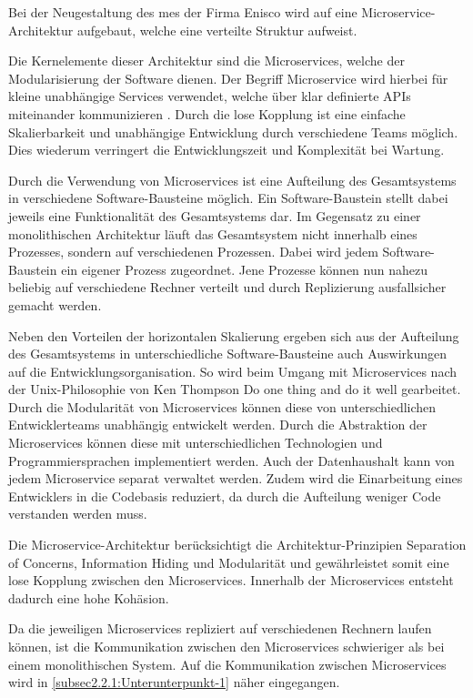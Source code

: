 Bei der Neugestaltung des \gls{mes} der Firma Enisco wird auf eine Microservice-Architektur aufgebaut, welche eine verteilte Struktur aufweist.

Die Kernelemente dieser Architektur sind die Microservices, welche der Modularisierung der Software dienen. Der Begriff Microservice wird hierbei für kleine unabhängige Services verwendet, welche über klar definierte APIs miteinander kommunizieren \cite{AmazonWebServicesInc..2021}. Durch die lose Kopplung ist eine einfache Skalierbarkeit und unabhängige Entwicklung durch verschiedene Teams möglich. Dies wiederum verringert die Entwicklungszeit und Komplexität bei Wartung.

Durch die Verwendung von Microservices ist eine Aufteilung des Gesamtsystems in verschiedene Software-Bausteine möglich. Ein Software-Baustein stellt dabei jeweils eine Funktionalität des Gesamtsystems dar. Im Gegensatz zu einer monolithischen Architektur läuft das Gesamtsystem nicht innerhalb eines Prozesses, sondern auf verschiedenen Prozessen. Dabei wird jedem Software-Baustein ein eigener Prozess zugeordnet. Jene Prozesse können nun nahezu beliebig auf verschiedene Rechner verteilt und durch Replizierung ausfallsicher gemacht werden. \cite{GaryCalcott.2018}

Neben den Vorteilen der horizontalen Skalierung ergeben sich aus der Aufteilung des Gesamtsystems in unterschiedliche Software-Bausteine auch Auswirkungen auf die Entwicklungsorganisation. So wird beim Umgang mit Microservices nach der Unix-Philosophie von Ken Thompson \glqq Do one thing and do it well\grqq{} \cite{IONOSSE.2021} gearbeitet. Durch die Modularität von Microservices können diese von unterschiedlichen Entwicklerteams unabhängig entwickelt werden. Durch die Abstraktion der Microservices können diese mit unterschiedlichen Technologien und Programmiersprachen implementiert werden. Auch der Datenhaushalt kann von jedem Microservice separat verwaltet werden. Zudem wird die Einarbeitung eines Entwicklers in die Codebasis reduziert, da durch die Aufteilung weniger Code verstanden werden muss.

Die Microservice-Architektur berücksichtigt die Architektur-Prinzipien Separation of Concerns, Information Hiding und Modularität und gewährleistet somit eine lose Kopplung zwischen den Microservices. Innerhalb der Microservices entsteht dadurch eine hohe Kohäsion.

Da die jeweiligen Microservices repliziert auf verschiedenen Rechnern laufen können, ist die Kommunikation zwischen den Microservices schwieriger als bei einem monolithischen System. Auf die Kommunikation zwischen Microservices wird in \autoref{subsec2.2.1:Unterunterpunkt-1} näher eingegangen.

